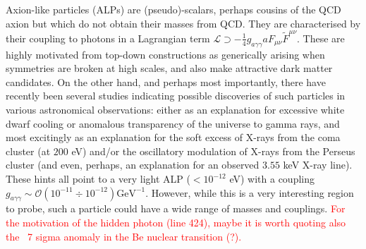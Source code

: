 Axion-like particles (ALPs) are (pseudo)-scalars, perhaps cousins of the QCD axion but which do not obtain their masses from QCD. They are characterised by their coupling to photons in a Lagrangian term $\mathcal{L} \supset - \frac{1}{4} g_{a\gamma \gamma} a F_{\mu \nu} \tilde{F}^{\mu \nu}.$ These are highly motivated from top-down constructions as generically arising when symmetries are broken at high scales, and also make attractive dark matter candidates. On the other hand, and perhaps most importantly, there have recently been several studies indicating possible discoveries of such particles in various astronomical observations: either as an explanation for excessive white dwarf cooling or anomalous transparency of the universe to gamma rays, and most excitingly as an explanation for the soft excess of X-rays from the coma cluster (at $200$ eV) and/or the oscillatory modulation of X-rays from the Perseus cluster (and even, perhaps, an explanation for an observed $3.55$ keV X-ray line). These hints all point to a very light ALP ($< 10^{-12}$ eV) with a coupling $g_{a\gamma \gamma} \sim \mathcal{O}(10^{-11} \div 10^{-12}) \mathrm{GeV}^{-1}.$ However, while this is a very interesting region to probe, such a particle could have a wide range of masses and couplings. 
\textcolor{red}{For the motivation of the hidden photon (line 424), maybe it is worth quoting also  the ~7 sigma anomaly in the Be nuclear transition (?).}




